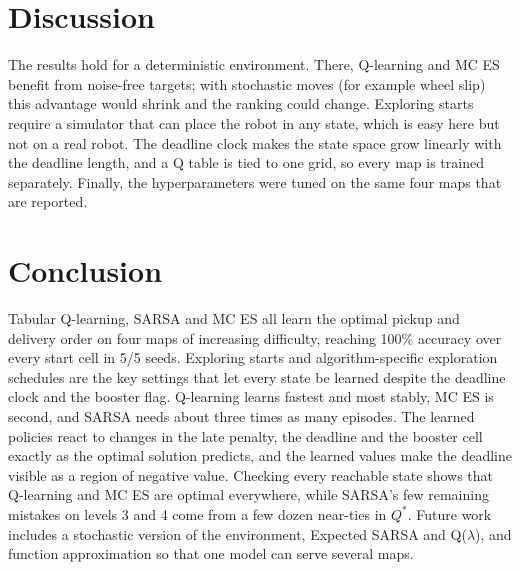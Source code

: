 \documentclass[conference]{IEEEtran}
\newcommand{\Qs}{Q^{*}}
\begin{document}
\section{Discussion}
The results hold for a deterministic environment. There, Q-learning and MC ES benefit from noise-free targets; with stochastic moves (for example wheel slip) this advantage would shrink and the ranking could change. Exploring starts require a simulator that can place the robot in any state, which is easy here but not on a real robot. The deadline clock makes the state space grow linearly with the deadline length, and a Q table is tied to one grid, so every map is trained separately. Finally, the hyperparameters were tuned on the same four maps that are reported.

\section{Conclusion}
Tabular Q-learning, SARSA and MC ES all learn the optimal pickup and delivery order on four maps of increasing difficulty, reaching 100\% accuracy over every start cell in 5/5 seeds. Exploring starts and algorithm-specific exploration schedules are the key settings that let every state be learned despite the deadline clock and the booster flag. Q-learning learns fastest and most stably, MC ES is second, and SARSA needs about three times as many episodes. The learned policies react to changes in the late penalty, the deadline and the booster cell exactly as the optimal solution predicts, and the learned values make the deadline visible as a region of negative value. Checking every reachable state shows that Q-learning and MC ES are optimal everywhere, while SARSA's few remaining mistakes on levels 3 and 4 come from a few dozen near-ties in $\Qs$. Future work includes a stochastic version of the environment, Expected SARSA and Q($\lambda$), and function approximation so that one model can serve several maps.
\end{document}

